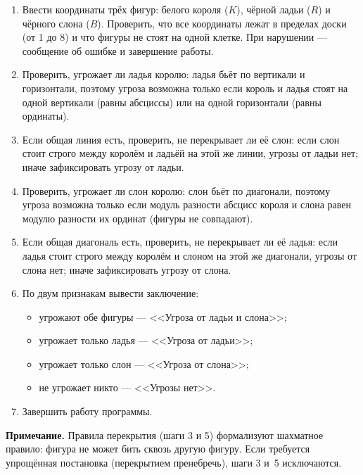 \documentclass[12pt,a4paper]{article}
\begin{document}
\begin{enumerate}
  \item Ввести координаты трёх фигур: белого короля ($K$), чёрной
        ладьи ($R$) и чёрного слона ($B$). Проверить, что все
        координаты лежат в пределах доски (от 1 до 8) и что фигуры
        не стоят на одной клетке. При нарушении --- сообщение об
        ошибке и завершение работы.
  \item Проверить, угрожает ли ладья королю: ладья бьёт по вертикали
        и горизонтали, поэтому угроза возможна только если король и
        ладья стоят на одной вертикали (равны абсциссы) или на одной
        горизонтали (равны ординаты).
  \item Если общая линия есть, проверить, не перекрывает ли её слон:
        если слон стоит строго между королём и ладьёй на этой же
        линии, угрозы от ладьи нет; иначе зафиксировать угрозу от ладьи.
  \item Проверить, угрожает ли слон королю: слон бьёт по диагонали,
        поэтому угроза возможна только если модуль разности абсцисс
        короля и слона равен модулю разности их ординат (фигуры не
        совпадают).
  \item Если общая диагональ есть, проверить, не перекрывает ли её
        ладья: если ладья стоит строго между королём и слоном на этой
        же диагонали, угрозы от слона нет; иначе зафиксировать угрозу
        от слона.
  \item По двум признакам вывести заключение:
        \begin{itemize}[nosep]
          \item угрожают обе фигуры --- <<Угроза от ладьи и слона>>;
          \item угрожает только ладья --- <<Угроза от ладьи>>;
          \item угрожает только слон --- <<Угроза от слона>>;
          \item не угрожает никто --- <<Угрозы нет>>.
        \end{itemize}
  \item Завершить работу программы.
\end{enumerate}

\textbf{Примечание.} Правила перекрытия (шаги 3 и 5) формализуют
шахматное правило: фигура не может бить сквозь другую фигуру. Если
требуется упрощённая постановка (перекрытием пренебречь), шаги 3 и~5
исключаются.

\end{document}
